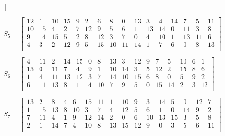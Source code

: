 \documentclass[a4paper, 14pt]{extarticle}
\begin{document}
\begin{enumerate}
\begin{equation}
\begin{array}{c}
\begin{bmatrix}
            \end{bmatrix}\\
            \\
            S_5 = \begin{bmatrix}
                12  & 1   & 10  & 15  & 9   & 2   & 6   & 8   & 0   & 13  & 3   & 4   & 14  & 7   & 5   & 11  \\
                10  & 15  & 4   & 2   & 7   & 12  & 9   & 5   & 6   & 1   & 13  & 14  & 0   & 11  & 3   & 8   \\
                9   & 14  & 15  & 5   & 2   & 8   & 12  & 3   & 7   & 0   & 4   & 10  & 1   & 13  & 11  & 6   \\
                4   & 3   & 2   & 12  & 9   & 5   & 15  & 10  & 11  & 14  & 1   & 7   & 6   & 0   & 8   & 13  \\
            \end{bmatrix}\\
            \\
            S_6 = \begin{bmatrix}
                4   & 11  & 2   & 14  & 15  & 0   & 8   & 13  & 3   & 12  & 9   & 7   & 5   & 10  & 6   & 1   \\
                13  & 0   & 11  & 7   & 4   & 9   & 1   & 10  & 14  & 3   & 5   & 12  & 2   & 15  & 8   & 6   \\
                1   & 4   & 11  & 13  & 12  & 3   & 7   & 14  & 10  & 15  & 6   & 8   & 0   & 5   & 9   & 2   \\
                6   & 11  & 13  & 8   & 1   & 4   & 10  & 7   & 9   & 5   & 0   & 15  & 14  & 2   & 3   & 12  \\
            \end{bmatrix}\\
            \\
            S_7 = \begin{bmatrix}
                13  & 2   & 8   & 4   & 6   & 15  & 11  & 1   & 10  & 9   & 3   & 14  & 5   & 0   & 12  & 7   \\
                1   & 15  & 13  & 8   & 10  & 3   & 7   & 4   & 12  & 5   & 6   & 11  & 0   & 14  & 9   & 2   \\
                7   & 11  & 4   & 1   & 9   & 12  & 14  & 2   & 0   & 6   & 10  & 13  & 15  & 3   & 5   & 8   \\
                2   & 1   & 14  & 7   & 4   & 10  & 8   & 13  & 15  & 12  & 9   & 0   & 3   & 5   & 6   & 11  \\
            \end{bmatrix}\\

\end{array}
\end{equation}
\end{enumerate}
\end{document}

